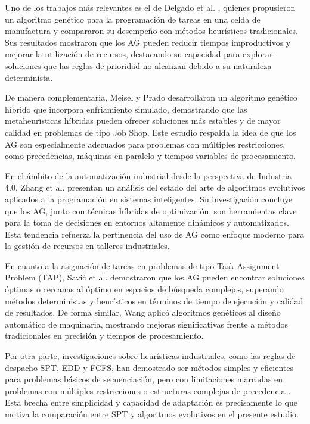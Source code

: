Uno de los trabajos más relevantes es el de Delgado et al. \cite{Delgado2005}, quienes propusieron 
un algoritmo genético para la programación de tareas en una celda de manufactura y compararon su 
desempeño con métodos heurísticos tradicionales. Sus resultados mostraron que los AG pueden reducir 
tiempos improductivos y mejorar la utilización de recursos, destacando su capacidad para explorar 
soluciones que las reglas de prioridad no alcanzan debido a su naturaleza determinista.

De manera complementaria, Meisel y Prado \cite{meisel2010} desarrollaron un algoritmo genético 
híbrido que incorpora enfriamiento simulado, demostrando que las metaheurísticas híbridas pueden 
ofrecer soluciones más estables y de mayor calidad en problemas de tipo Job Shop. Este estudio 
respalda la idea de que los AG son especialmente adecuados para problemas con múltiples restricciones, 
como precedencias, máquinas en paralelo y tiempos variables de procesamiento.

En el ámbito de la automatización industrial desde la perspectiva de Industria 4.0, 
Zhang et al. \cite{industry4} presentan un análisis del estado del arte de algoritmos 
evolutivos aplicados a la programación en sistemas inteligentes. Su investigación concluye 
que los AG, junto con técnicas híbridas de optimización, son herramientas clave para la toma 
de decisiones en entornos altamente dinámicos y automatizados. Esta tendencia refuerza la 
pertinencia del uso de AG como enfoque moderno para la gestión de recursos en talleres 
industriales.

En cuanto a la asignación de tareas en problemas de tipo Task Assignment Problem (TAP), Savić 
et al. \cite{ref10} demostraron que los AG pueden encontrar soluciones óptimas o cercanas al 
óptimo en espacios de búsqueda complejos, superando métodos deterministas y heurísticos en 
términos de tiempo de ejecución y calidad de resultados. De forma similar, Wang \cite{ref9} 
aplicó algoritmos genéticos al diseño automático de maquinaria, mostrando mejoras significativas 
frente a métodos tradicionales en precisión y tiempos de procesamiento.

Por otra parte, investigaciones sobre heurísticas industriales, como las reglas de 
despacho SPT, EDD y FCFS, han demostrado ser métodos simples y eficientes para problemas 
básicos de secuenciación, pero con limitaciones marcadas en problemas con múltiples 
restricciones o estructuras complejas de precedencia \cite{flowshop}. Esta 
brecha entre simplicidad y capacidad de adaptación es precisamente lo que motiva la 
comparación entre SPT y algoritmos evolutivos en el presente estudio.

